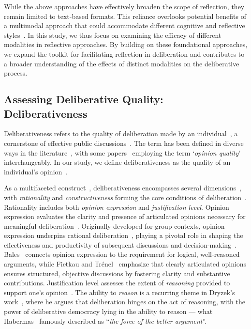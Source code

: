 While the above approaches have effectively broaden the scope of reflection, they remain limited to text-based formats. This reliance overlooks potential benefits of a multimodal approach that could accommodate different cognitive and reflective styles~\cite{mayer2005cambridge}. In this study, we thus focus on examining the efficacy of different modalities in reflective approaches. By building on these foundational approaches, we expand the toolkit for facilitating reflection in deliberation and contributes to a broader understanding of the effects of distinct modalities on the deliberative process. 

\subsection{Assessing Deliberative Quality: Deliberativeness}
\label{sec: measurements}
Deliberativeness refers to the quality of deliberation made by an individual~\cite{trenel2004measuring}, a cornerstone of effective public discussions~\cite{menon2020nudge}. The term has been defined in diverse ways in the literature~\cite{graham2003search, price2002does, steenbergen2003measuring, stromer2007measuring}, with some papers~\cite{bohman2000public, price2002does, zhang2021nudge} employing the term `\textit{opinion quality}' interchangeably. In our study, we define deliberativeness as the quality of an individual's opinion~\cite{menon2020nudge}.

As a multifaceted construct~\cite{menon2020nudge, zhang2021nudge}, deliberativeness encompasses several dimensions~\cite{trenel2004measuring, price2002does, steenbergen2003measuring, stromer2007measuring}, with \textit{rationality} and \textit{constructiveness} forming the core conditions of deliberation~\cite{trenel2004measuring}. Rationality includes both \textit{opinion expression} and \textit{justification level}. Opinion expression evaluates the clarity and presence of articulated opinions necessary for meaningful deliberation~\cite{trenel2004measuring}. Originally developed for group contexts, opinion expression underpins rational deliberation~\cite{beck2000argumentation}, playing a pivotal role in shaping the effectiveness and productivity of subsequent discussions and decision-making~\cite{beck2000argumentation}. Bales~\cite{bales1983overview} connects opinion expression to the requirement for logical, well-reasoned arguments, while Fietkau and Trénel~\cite{fietkau2002interaktionsmuster} emphasize that clearly articulated opinions ensures structured, objective discussions by fostering clarity and substantive contributions. 
Justification level assesses the extent of \textit{reasoning} provided to support one's opinion~\cite{trenel2004measuring}. The ability to \textit{reason} is a recurring theme in Dryzek's work~\cite{dryzek2002deliberative}, where he argues that deliberation hinges on the act of reasoning, with the power of deliberative democracy lying in the ability to reason --- what Habermas~\cite{habermas2015between} famously described as ``\textit{the force of the better argument}''. 

